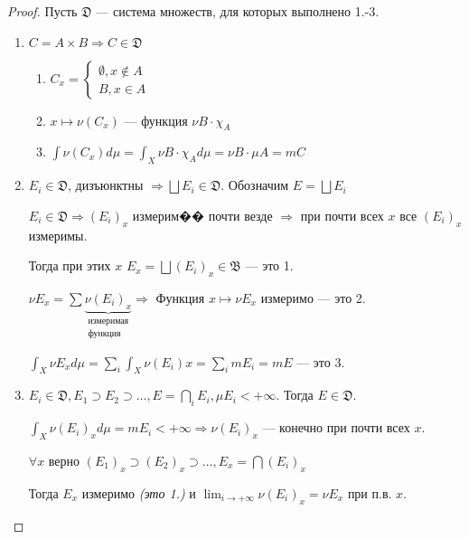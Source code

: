 \begin{proof}
    Пусть \(\mathfrak{D}\) --- система множеств, для которых выполнено 1.-3.

    \begin{enumerate}
        \item \(C = A \times B \Rightarrow C\in \mathfrak{D}\)

              \begin{enumerate}
                  \item \(C_x = \begin{cases}
                            \emptyset, x\not\in A \\
                            B, x\in A
                        \end{cases}\)
                  \item \(x \mapsto \nu(C_x)\) --- функция \(\nu B \cdot \chi_A\)
                  \item \(\int \nu(C_x) d\mu = \int_X \nu B \cdot \chi_A d \mu = \nu B \cdot \mu A = mC\)
              \end{enumerate}

        \item \(E_i \in \mathfrak{D}\), дизъюнктны \( \Rightarrow \bigsqcup E_i\in \mathfrak{D}\). Обозначим \(E = \bigsqcup E_i\)

              \(E_i \in \mathfrak{D} \Rightarrow (E_i)_x\) измерим�� почти везде \( \Rightarrow \) при почти всех \(x\) все \((E_i)_x\) измеримы.

              Тогда при этих \(x\) \(E_x = \bigsqcup (E_i)_x \in \mathfrak{B}\) --- это 1.

              \(\nu E_x = \sum \underbrace{\nu(E_i)_x}_{\substack{\text{измеримая} \\ \text{функция}}} \Rightarrow\) Функция \(x \mapsto \nu E_x\) измеримо --- это 2.

              \(\int_X \nu E_x d\mu = \sum_i \int_X \nu(E_i) x = \sum_i m E_i = m E\) --- это 3.

        \item \(E_i \in \mathfrak{D}, E_1 \supset E_2 \supset \dots , E = \bigcap_i E_i, \mu E_i < +\infty\). Тогда \(E\in \mathfrak{D}\).

              \(\int_X \nu(E_i)_x d\mu = m E_i < +\infty \Rightarrow \nu(E_i)_x\) --- конечно при почти всех \(x\).

              \(\forall x\) верно \((E_1)_x \supset (E_2)_x \supset \dots , E_x = \bigcap (E_i)_x\)

              Тогда \(E_x\) измеримо \textit{(это 1.)} и \(\lim_{i \to +\infty} \nu(E_i)_x = \nu E_x\) при п.в. \(x\).


\end{enumerate}
\end{proof}
